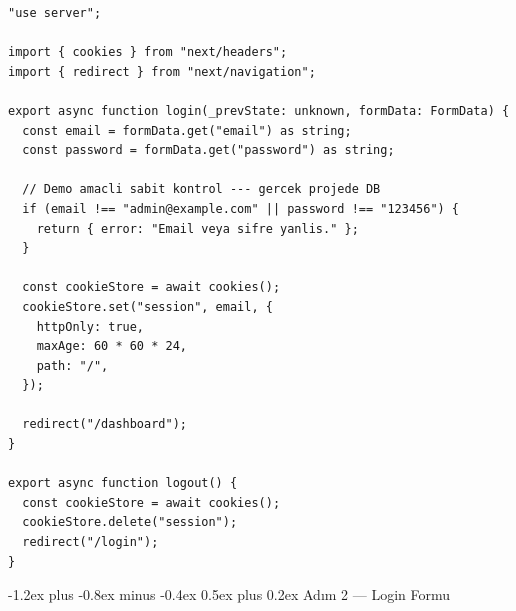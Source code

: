 \documentclass[12pt, a4paper]{article}
\makeatletter
\renewcommand{\subsection}{%
  \@startsection{subsection}{2}{\z@}%
    {-1.2ex plus -0.8ex minus -0.4ex}%
    {0.5ex plus 0.2ex}%
    {\normalfont\large\bfseries\sffamily\color{secondary}}%
}
\makeatother
\begin{document}
\begin{tcolorbox}[enhanced, colback=codebg, colframe=gray!30,
    colbacktitle=authcol!85!black, coltitle=white, arc=4pt,
    title={\sffamily\bfseries\small src/app/login/actions.ts}]
\begin{lstlisting}[style=jsxstyle]
"use server";

import { cookies } from "next/headers";
import { redirect } from "next/navigation";

export async function login(_prevState: unknown, formData: FormData) {
  const email = formData.get("email") as string;
  const password = formData.get("password") as string;

  // Demo amacli sabit kontrol --- gercek projede DB
  if (email !== "admin@example.com" || password !== "123456") {
    return { error: "Email veya sifre yanlis." };
  }

  const cookieStore = await cookies();
  cookieStore.set("session", email, {
    httpOnly: true,
    maxAge: 60 * 60 * 24,
    path: "/",
  });

  redirect("/dashboard");
}

export async function logout() {
  const cookieStore = await cookies();
  cookieStore.delete("session");
  redirect("/login");
}
\end{lstlisting}
\end{tcolorbox}

\newpage
\subsection{Adım 2 --- Login Formu}
\end{document}
